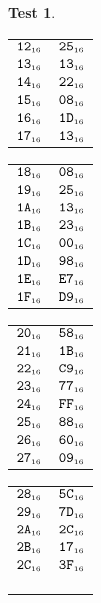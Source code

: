 \documentclass[a4paper,12pt]{article}
\makeatletter
\newcommand{\num}[1]{\texttt{#1}}
\newcommand{\hex}[1]{\num{#1}_{\textup{\tiny 16}}}
\newcommand{\MEM}[1]{\ifthenelse{\equal{#1}{}}{M}{M[#1]}}
\theoremstyle{definition}
\newtheorem{test}{Test}
\newenvironment{memtable}{%
  \begin{trivlist}
    \item
    }{%
    \end{trivlist}}
\newenvironment{memcolumn}{%
  \begin{tabular}{@{}ll@{}}
    \hline}
    {%
    \hline
  \end{tabular}}
\newcommand{\memspace}{\qquad}
\makeatother
\begin{document}
\begin{test}
\begin{memtable}
\begin{memcolumn}
      $\hex{12}$ & $\hex{25}$ \\
      $\hex{13}$ & $\hex{13}$ \\
      $\hex{14}$ & $\hex{22}$ \\
      $\hex{15}$ & $\hex{08}$ \\
      $\hex{16}$ & $\hex{1D}$ \\
      $\hex{17}$ & $\hex{13}$ \\
    \end{memcolumn}
    \memspace
    \begin{memcolumn}
      $\hex{18}$ & $\hex{08}$ \\
      $\hex{19}$ & $\hex{25}$ \\
      $\hex{1A}$ & $\hex{13}$ \\
      $\hex{1B}$ & $\hex{23}$ \\
      $\hex{1C}$ & $\hex{00}$ \\
      $\hex{1D}$ & $\hex{98}$ \\
      $\hex{1E}$ & $\hex{E7}$ \\
      $\hex{1F}$ & $\hex{D9}$ \\
    \end{memcolumn}
    \memspace
    \begin{memcolumn}
      $\hex{20}$ & $\hex{58}$ \\
      $\hex{21}$ & $\hex{1B}$ \\
      $\hex{22}$ & $\hex{C9}$ \\
      $\hex{23}$ & $\hex{77}$ \\
      $\hex{24}$ & $\hex{FF}$ \\
      $\hex{25}$ & $\hex{88}$ \\
      $\hex{26}$ & $\hex{60}$ \\
      $\hex{27}$ & $\hex{09}$ \\
    \end{memcolumn}
    \memspace
    \begin{memcolumn}
      $\hex{28}$ & $\hex{5C}$ \\
      $\hex{29}$ & $\hex{7D}$ \\
      $\hex{2A}$ & $\hex{2C}$ \\
      $\hex{2B}$ & $\hex{17}$ \\
      $\hex{2C}$ & $\hex{3F}$ \\
      \\
      \\
      \\
    \end{memcolumn}
  \end{memtable}

\end{test}
\end{document}
